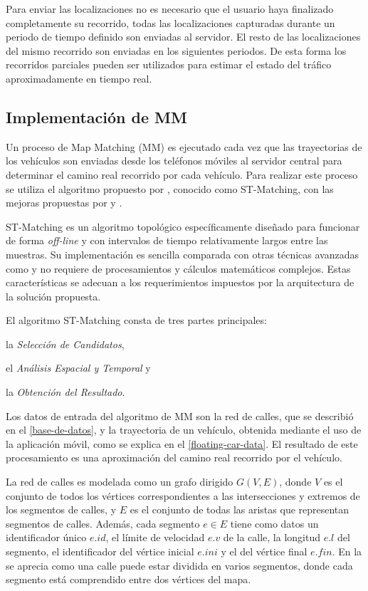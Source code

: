 Para enviar las localizaciones no es necesario que el usuario haya finalizado completamente su recorrido, todas las localizaciones capturadas durante un periodo de tiempo definido son enviadas al servidor. El resto de las localizaciones del mismo recorrido son enviadas en los siguientes periodos. De esta forma los recorridos parciales pueden ser utilizados para estimar el estado del tráfico aproximadamente en tiempo real.

\subsection{Implementación de MM}
\label{implementacion_mm}

Un proceso de Map Matching (MM) es ejecutado cada vez que las trayectorias de los vehículos son enviadas desde los teléfonos móviles al servidor central para determinar el camino real recorrido por cada vehículo. Para realizar este proceso se utiliza el algoritmo propuesto por \cite{lou2009map}, conocido como ST-Matching, con las mejoras propuestas por \cite{budigm2012algorithm} y \cite{sakic2012map}. 

ST-Matching es un algoritmo topológico específicamente diseñado para funcionar de forma \emph{off-line} y con intervalos de tiempo relativamente largos entre las muestras. Su implementación es sencilla comparada con otras técnicas avanzadas como \cite{quddus2006high, newson2009hidden} y no requiere de procesamientos y cálculos matemáticos complejos. Estas características se adecuan a los requerimientos impuestos por la arquitectura de la solución propuesta. 

El algoritmo ST-Matching consta de tres partes principales: \begin{enumerate*}[a)]
\item la \emph{Selección de Candidatos},
\item el \emph{Análisis Espacial y Temporal} y
\item la \emph{Obtención del Resultado}.
\end{enumerate*}

Los datos de entrada del algoritmo de MM son la red de calles, que se describió en el \cref{base-de-datos}, y la trayectoria de un vehículo, obtenida mediante el uso de la aplicación móvil, como se explica en el \cref{floating-car-data}. El resultado de este procesamiento es una aproximación del camino real recorrido por el vehículo.

La red de calles es modelada como un grafo dirigido $G(V,E)$, donde $V$ es el conjunto de todos los vértices correspondientes a las intersecciones y extremos de los segmentos de calles, y $E$ es el conjunto de todas las aristas que representan segmentos de calles. Además, cada segmento $e \in E$ tiene como datos un identificador único $e.id$, el límite de velocidad $e.v$ de la calle, la longitud $e.l$ del segmento, el identificador del vértice inicial $e.ini$ y el del vértice final $e.fin$. En la  se aprecia como una calle puede estar dividida en varios segmentos, donde cada segmento está comprendido entre dos vértices del mapa.

